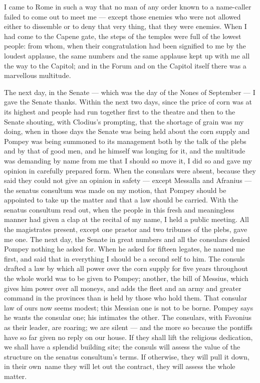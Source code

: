  I came to Rome in such a way that no man of any order known to a name-caller failed to come out to meet me --- except those enemies who were not allowed either to dissemble or to deny that very thing, that they were enemies. When I had come to the Capene gate, the steps of the temples were full of the lowest people: from whom, when their congratulation had been signified to me by the loudest applause, the same numbers and the same applause kept up with me all the way to the Capitol; and in the Forum and on the Capitol itself there was a marvellous multitude.

 The next day, in the Senate --- which was the day of the Nones of September --- I gave the Senate thanks. Within the next two days, since the price of corn was at its highest and people had run together first to the theatre and then to the Senate shouting, with Clodius's prompting, that the shortage of grain was my doing, when in those days the Senate was being held about the corn supply and Pompey was being summoned to its management both by the talk of the plebs and by that of good men, and he himself was longing for it, and the multitude was demanding by name from me that I should so move it, I did so and gave my opinion in carefully prepared form. When the consulars were absent, because they said they could not give an opinion in safety --- except Messalla and Afranius --- the senatus consultum was made on my motion, that Pompey should be appointed to take up the matter and that a law should be carried. With the senatus consultum read out, when the people in this fresh and meaningless manner had given a clap at the recital of my name, I held a public meeting. All the magistrates present, except one praetor and two tribunes of the plebs, gave me one. The next day, the Senate in great numbers and all the consulars denied Pompey nothing he asked for. When he asked for fifteen legates, he named me first, and said that in everything I should be a second self to him. The consuls drafted a law by which all power over the corn supply for five years throughout the whole world was to be given to Pompey; another, the bill of Messius, which gives him power over all moneys, and adds the fleet and an army and greater command in the provinces than is held by those who hold them. That consular law of ours now seems modest; this Messian one is not to be borne. Pompey says he wants the consular one; his intimates the other. The consulars, with Favonius as their leader, are roaring; we are silent --- and the more so because the pontiffs have so far given no reply on our house. If they shall lift the religious dedication, we shall have a splendid building site; the consuls will assess the value of the structure on the senatus consultum's terms. If otherwise, \textdagger they will pull it down, in their own\textdagger\ name they will let out the contract, they will assess the whole matter.

